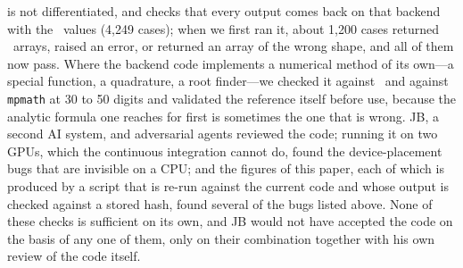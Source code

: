 is not differentiated, and checks that every output comes back on that
backend with the \numpy\ values (4,249 cases); when we first ran it,
about 1,200 cases returned \numpy\ arrays, raised an error, or returned
an array of the wrong shape, and all of them now pass. Where the
backend code implements a numerical method of its own---a special
function, a quadrature, a root finder---we checked it against \scipy\
and against \texttt{mpmath} at 30 to 50 digits and validated the
reference itself before use, because the analytic formula one reaches
for first is sometimes the one that is wrong. JB, a second AI system,
and adversarial agents reviewed the code; running it on two GPUs, which
the continuous integration cannot do, found the device-placement bugs
that are invisible on a CPU; and the figures of this paper, each of
which is produced by a script that is re-run against the current code
and whose output is checked against a stored hash, found several of the
bugs listed above. None of these checks is sufficient on its own, and
JB would not have accepted the code on the basis of any one of them,
only on their combination together with his own review of the code
itself.

